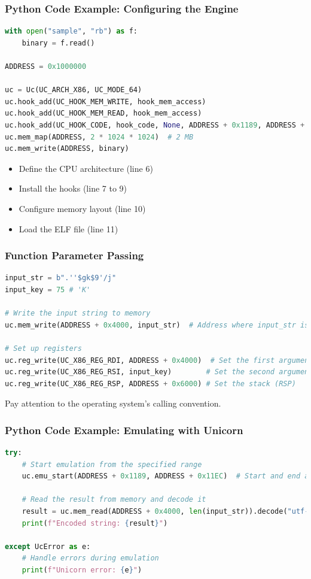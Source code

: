 \begin{frame}[fragile]
\frametitle{Python Code Example: Configuring the Engine}
\begin{lstlisting}[language=Python, caption={Unicorn Engine Example with Hooks}]
with open("sample", "rb") as f:
    binary = f.read()

ADDRESS = 0x1000000

uc = Uc(UC_ARCH_X86, UC_MODE_64)
uc.hook_add(UC_HOOK_MEM_WRITE, hook_mem_access)
uc.hook_add(UC_HOOK_MEM_READ, hook_mem_access)
uc.hook_add(UC_HOOK_CODE, hook_code, None, ADDRESS + 0x1189, ADDRESS + 0x12AC)
uc.mem_map(ADDRESS, 2 * 1024 * 1024)  # 2 MB
uc.mem_write(ADDRESS, binary)
\end{lstlisting}

\begin{itemize}
	\item Define the CPU architecture (line 6)
	\item Install the hooks (line 7 to 9)
	\item Configure memory layout (line 10)
	\item Load the ELF file (line 11)
\end{itemize}
\end{frame}

\begin{frame}[fragile]
\frametitle{Function Parameter Passing}
\begin{lstlisting}[language=Python, caption={Unicorn Engine Example: Setting Arguments}]
input_str = b".''$gk$9'/j"
input_key = 75 # 'K'  

# Write the input string to memory
uc.mem_write(ADDRESS + 0x4000, input_str)  # Address where input_str is stored (binary 16K, string at 17K)

# Set up registers
uc.reg_write(UC_X86_REG_RDI, ADDRESS + 0x4000)  # Set the first argument (address of the string)
uc.reg_write(UC_X86_REG_RSI, input_key)        # Set the second argument (offset)
uc.reg_write(UC_X86_REG_RSP, ADDRESS + 0x6000) # Set the stack (RSP)
\end{lstlisting}

Pay attention to the operating system's calling convention.
\end{frame}



\begin{frame}[fragile]
\frametitle{Python Code Example: Emulating with Unicorn}
\begin{lstlisting}[language=Python, caption={Unicorn Engine Emulation Example}]
try:
    # Start emulation from the specified range
    uc.emu_start(ADDRESS + 0x1189, ADDRESS + 0x11EC)  # Start and end addresses recovered from Ghidra

    # Read the result from memory and decode it
    result = uc.mem_read(ADDRESS + 0x4000, len(input_str)).decode("utf-8")
    print(f"Encoded string: {result}")

except UcError as e:
    # Handle errors during emulation
    print(f"Unicorn error: {e}")
\end{lstlisting}

\end{frame}

